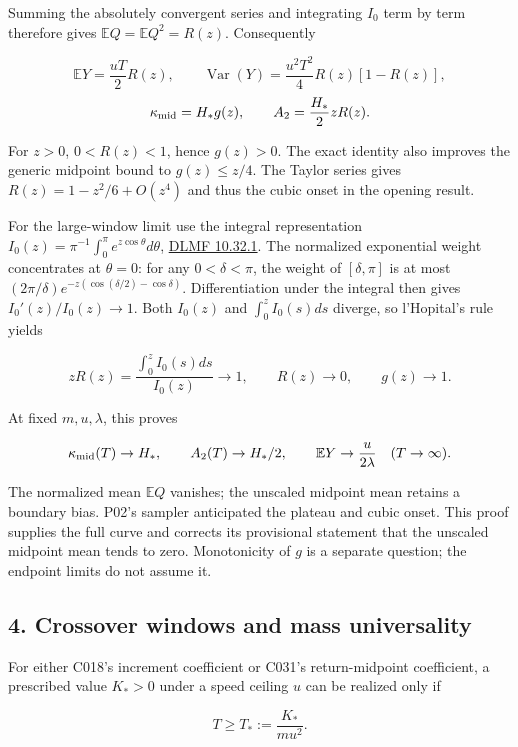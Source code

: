 \documentclass[11pt,a4paper]{article}
\begin{document}
Summing the absolutely convergent series and integrating \(I_0\) term by
term therefore gives \(\mathbb E Q=\mathbb E Q^2=R(z)\). Consequently

\[\mathbb E Y=\frac{uT}{2}R(z),\qquad
\operatorname{Var}(Y)=\frac{u^2T^2}{4}R(z)[1-R(z)],\]
\[\kappa_{\rm mid}=H_*g(z),\qquad A_2=\frac{H_*}{2}zR(z).\]

For \(z>0\), \(0<R(z)<1\), hence \(g(z)>0\). The exact identity also
improves the generic midpoint bound to \(g(z)\le z/4\). The Taylor
series gives \(R(z)=1-z^2/6+O(z^4)\) and thus the cubic onset in the
opening result.

For the large-window limit use the integral representation
\(I_0(z)=\pi^{-1}\int_0^\pi e^{z\cos\theta}d\theta\),
\href{https://dlmf.nist.gov/10.32.E1}{DLMF 10.32.1}. The normalized
exponential weight concentrates at \(\theta=0\): for any
\(0<\delta<\pi\), the weight of \([\delta,\pi]\) is at most
\((2\pi/\delta)e^{-z(\cos(\delta/2)-\cos\delta)}\). Differentiation
under the integral then gives \(I_0'(z)/I_0(z)\to1\). Both \(I_0(z)\)
and \(\int_0^zI_0(s)ds\) diverge, so l'Hopital's rule yields

\[zR(z)=\frac{\int_0^zI_0(s)ds}{I_0(z)}\longrightarrow1,
\qquad R(z)\longrightarrow0,\qquad g(z)\longrightarrow1.\]

At fixed \(m,u,\lambda\), this proves

\[\kappa_{\rm mid}(T)\to H_*,\qquad A_2(T)\to H_*/2,
\qquad \mathbb E Y\to\frac{u}{2\lambda}\quad(T\to\infty).\]

The normalized mean \(\mathbb E Q\) vanishes; the unscaled midpoint mean
retains a boundary bias. P02's sampler anticipated the plateau and cubic
onset. This proof supplies the full curve and corrects its provisional
statement that the unscaled midpoint mean tends to zero. Monotonicity of
\(g\) is a separate question; the endpoint limits do not assume it.

\hypertarget{crossover-windows-and-mass-universality}{%
\subsection{4. Crossover windows and mass
universality}\label{crossover-windows-and-mass-universality}}

For either C018's increment coefficient or C031's return-midpoint
coefficient, a prescribed value \(K_*>0\) under a speed ceiling \(u\)
can be realized only if

\[T\ge T_*:=\frac{K_*}{mu^2}.\]
\end{document}
